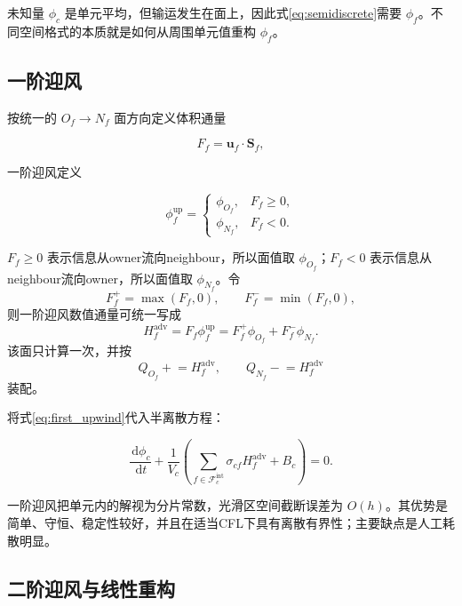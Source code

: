 \documentclass[UTF8,12pt,a4paper,fontset=fandol]{ctexart}
\numberwithin{equation}{section}
\newcommand{\dd}{\,\mathrm d}
\newcommand{\Sf}{\bm S}
\begin{document}
未知量 $\phi_c$ 是单元平均，但输运发生在面上，因此式\eqref{eq:semidiscrete}需要 $\phi_f$。不同空间格式的本质就是如何从周围单元值重构 $\phi_f$。

\subsection{一阶迎风}

按统一的 $O_f\to N_f$ 面方向定义体积通量

\begin{equation}
  F_f=\bm u_f\cdot\Sf_f,
\end{equation}

一阶迎风定义

\begin{equation}
  \phi_f^{\mathrm{up}}
  =
  \begin{cases}
  \phi_{O_f},&F_f\geq0,\\
  \phi_{N_f},&F_f<0.
  \end{cases}
  \label{eq:first_upwind}
\end{equation}

$F_f\geq0$ 表示信息从owner流向neighbour，所以面值取 $\phi_{O_f}$；$F_f<0$ 表示信息从neighbour流向owner，所以面值取 $\phi_{N_f}$。令
\begin{equation}
  F_f^+=\max(F_f,0),
  \qquad
  F_f^-=\min(F_f,0),
\end{equation}
则一阶迎风数值通量可统一写成
\begin{equation}
  \boxed{
  H_f^{\mathrm{adv}}
  =F_f\phi_f^{\mathrm{up}}
  =F_f^+\phi_{O_f}+F_f^-\phi_{N_f}.}
  \label{eq:upwind_numerical_flux}
\end{equation}
该面只计算一次，并按
\begin{equation}
  Q_{O_f}\mathrel{+}=H_f^{\mathrm{adv}},
  \qquad
  Q_{N_f}\mathrel{-}=H_f^{\mathrm{adv}}
\end{equation}
装配。

将式\eqref{eq:first_upwind}代入半离散方程：

\begin{equation}
  \frac{\dd\phi_c}{\dd t}
  +\frac1{V_c}
  \left(
  \sum_{f\in\mathcal F_c^{\mathrm{int}}}
  \sigma_{cf}H_f^{\mathrm{adv}}+B_c
  \right)=0.
  \label{eq:upwind_semidiscrete}
\end{equation}

一阶迎风把单元内的解视为分片常数，光滑区空间截断误差为 $O(h)$。其优势是简单、守恒、稳定性较好，并且在适当CFL下具有离散有界性；主要缺点是人工耗散明显。

\subsection{二阶迎风与线性重构}
\end{document}
